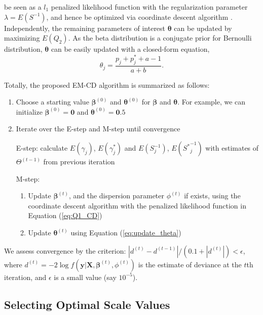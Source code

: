 \documentclass[AMA,STIX1COL,]{WileyNJD-v2}
\begin{document}
be seen as a \(l_1\) penalized likelihood function with the
regularization parameter \(\lambda = E(S^{-1})\), and hence be optimized
via coordinate descent algorithm \citep{Friedman2010}. Independently,
the remaining parameters of interest \(\boldsymbol{\theta}\) can be
updated by maximizing \(E(Q_2)\). As the beta distribution is a
conjugate prior for Bernoulli distribution, \(\boldsymbol{\theta}\) can
be easily updated with a closed-form equation,
\begin{equation}\label{eq:update_theta}
\theta_j = \frac{p_j + p^*_{j} + a - 1 }{a + b}.
\end{equation}

Totally, the proposed EM-CD algorithm is summarized as follows:

\begin{enumerate}
\def\labelenumi{\arabic{enumi})}
\item
  Choose a starting value \(\boldsymbol{\beta}^{(0)}\) and
  \(\boldsymbol{\theta}^{(0)}\) for \(\boldsymbol{\beta}\) and
  \(\boldsymbol{\theta}\). For example, we can initialize
  \(\boldsymbol{\beta}^{(0)} = \boldsymbol{0}\) and
  \(\boldsymbol{\theta}^{(0)} = \boldsymbol{0}.5\)
\item
  Iterate over the E-step and M-step until convergence

  E-step: calculate \(E(\gamma_{j})\), \(E(\gamma^*_{j})\) and
  \(E({S}^{-1}_{j})\), \(E({S^*}^{-1}_{j})\) with estimates of
  \(\Theta^{(t-1)}\) from previous iteration

  M-step:

  \begin{enumerate}
  \def\labelenumii{\alph{enumii})}
  \item
    Update \(\boldsymbol{\beta}^{(t)}\), and the dispersion parameter
    \(\phi^{(t)}\) if exists, using the coordinate descent algorithm
    with the penalized likelihood function in Equation (\ref{eq:Q1_CD})
  \item
    Update \(\boldsymbol{\theta}^{(t)}\) using Equation
    (\ref{eq:update_theta})
  \end{enumerate}
\end{enumerate}

We assess convergence by the criterion:
\(|d^{(t)}-d^{(t-1)}|/(0.1+|d^{(t)}|)<\epsilon\), where
\(d^{(t)} = -2\log f(\textbf{y}| \textbf{X}, \boldsymbol{\beta}^{(t)},\phi^{(t)})\)
is the estimate of deviance at the \(t\)th iteration, and \(\epsilon\)
is a small value (say \(10^{-5}\)).

\subsection{Selecting Optimal Scale Values}
\label{sec:tune}
\end{document}
